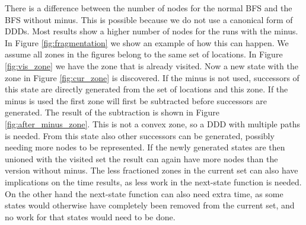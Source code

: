 There is a difference between the number of nodes for the normal BFS and the BFS without minus. This is possible because we do not use a canonical form of DDDs. Most results show a higher number of nodes for the runs with the minus. In Figure \ref{fig:fragmentation} we show an example of how this can happen. We assume all zones in the figures belong to the same set of locations. In Figure \ref{fig:vis_zone} we have the zone that is already visited. Now a new state with the zone in Figure \ref{fig:cur_zone} is discovered. If the minus is not used, successors of this state are directly generated from the set of locations and this zone. If the minus is used the first zone will first be subtracted before successors are generated. The result of the subtraction is shown in Figure \ref{fig:after_minus_zone}. This is not a convex zone, so a DDD with multiple paths is needed. From this state also other successors can be generated, possibly needing more nodes to be represented. If the newly generated states are then unioned with the visited set the result can again have more nodes than the version without minus. The less fractioned zones in the current set can also have implications on the time results, as less work in the next-state function is needed. On the other hand the next-state function can also need extra time, as some states would otherwise have completely been removed from the current set, and no work for that states would need to be done. 

